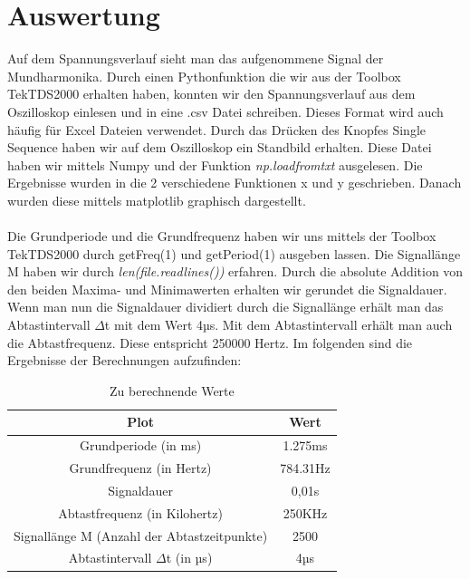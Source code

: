 \documentclass[12pt, oneside, a4paper, \docLanguage]{report}
\begin{document}
\section{Auswertung}
\label{chap:VERSUCH_1_AUSWERTUNG}
Auf dem Spannungsverlauf sieht man das aufgenommene Signal der Mundharmonika.
Durch einen Pythonfunktion die wir aus der Toolbox TekTDS2000 erhalten haben, konnten wir den Spannungsverlauf aus dem Oszilloskop einlesen und in eine .csv Datei schreiben.
\newline
Dieses Format wird auch häufig für Excel Dateien verwendet.
Durch das Drücken des Knopfes Single Sequence haben wir auf dem Oszilloskop ein Standbild erhalten.
\newline
Diese Datei haben wir mittels Numpy und der Funktion \textit{np.loadfromtxt} ausgelesen.
Die Ergebnisse wurden in die 2 verschiedene Funktionen x und y geschrieben.
\newline
Danach wurden diese mittels matplotlib graphisch dargestellt.
\\~\\
Die Grundperiode und die Grundfrequenz haben wir uns mittels der Toolbox TekTDS2000 durch getFreq(1) und getPeriod(1) ausgeben lassen.
Die Signallänge M haben wir durch \textit{len(file.readlines())} erfahren.
\newline 
Durch die absolute Addition von den beiden Maxima- und Minimawerten erhalten wir gerundet die Signaldauer.
Wenn man nun die Signaldauer dividiert durch die Signallänge erhält man das Abtastintervall $\Delta$t mit dem Wert 4µs.
\newline
Mit dem Abtastintervall erhält man auch die Abtastfrequenz. Diese entspricht 250000  Hertz.
Im folgenden sind die Ergebnisse der Berechnungen aufzufinden:
\begin{table}[H]
	\centering\small
	\begin{tabular}{|c|c|}
	\hline
	Plot & Wert \\
	\hline
	Grundperiode (in ms) & 1.275ms \\
	\hline
	Grundfrequenz (in Hertz) & 784.31Hz \\
	\hline
	Signaldauer &  0,01s\\
	\hline
	Abtastfrequenz (in Kilohertz) &  250KHz\\
	\hline
	Signallänge M (Anzahl der Abtastzeitpunkte) & 2500 \\
	\hline
	Abtastintervall $\Delta$t (in µs) & 4µs \\
	\hline
	\end{tabular}
	\caption{Zu berechnende Werte}
	\label{fig:VERSUCH_1_MESSWERTE}
\end{table}
\end{document}
